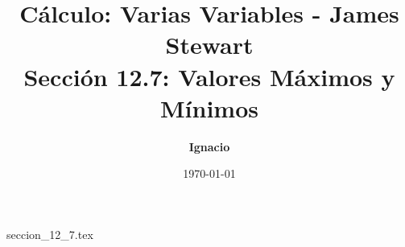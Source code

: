 \documentclass[11pt,spanish,oneside]{report}
\title{\textbf{Cálculo: Varias Variables - James Stewart} \\ \Large Sección 12.7: Valores Máximos y Mínimos}
\author{\textbf{Ignacio}}
\date{\today}
\begin{document}
\maketitle

{seccion_12_7.tex}
\end{document}
